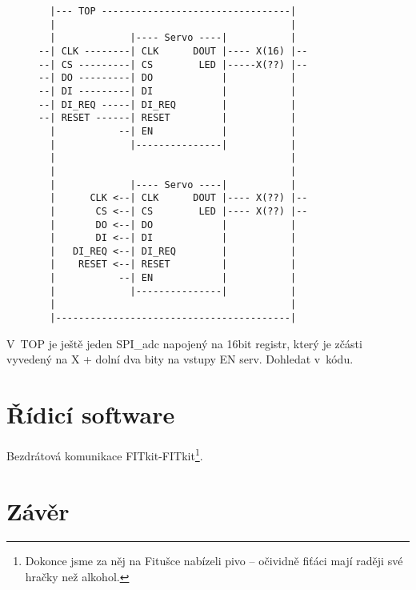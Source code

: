 \begin{figure}[h]
\centering
\begin{Verbatim}
  |--- TOP ---------------------------------|
  |                                         |
  |             |---- Servo ----|           |
--| CLK --------| CLK      DOUT |---- X(16) |--
--| CS ---------| CS        LED |-----X(??) |--
--| DO ---------| DO            |           |
--| DI ---------| DI            |           |
--| DI_REQ -----| DI_REQ        |           |
--| RESET ------| RESET         |           |
  |           --| EN            |           |
  |             |---------------|           |
  |                                         |
  |                                         |
  |             |---- Servo ----|           |
  |      CLK <--| CLK      DOUT |---- X(??) |--
  |       CS <--| CS        LED |---- X(??) |--
  |       DO <--| DO            |           |
  |       DI <--| DI            |           |
  |   DI_REQ <--| DI_REQ        |           |
  |    RESET <--| RESET         |           |
  |           --| EN            |           |
  |             |---------------|           |
  |                                         |
  |-----------------------------------------|
\end{Verbatim}
\end{figure}

V~TOP je ještě jeden SPI\_adc napojený na 16bit registr, který je zčásti vyvedený
na X + dolní dva bity na vstupy EN serv. Dohledat v~kódu.



\section{Řídicí software}
Bezdrátová komunikace FITkit-FITkit\footnote{Dokonce jsme za něj na Fitušce nabízeli pivo -- očividně fiťáci mají raději své hračky než alkohol.}.

\section{Závěr}











